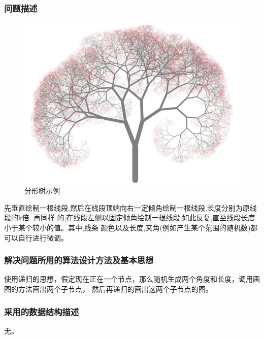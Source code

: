 \documentclass{ctexart}
\begin{document}
\subsubsection{问题描述}
\begin{figure}[H]
	\centering
	\includegraphics[scale=0.5]{../images/demo-tree.png}
	\caption{分形树示例}
\end{figure}

先垂直绘制一根线段,然后在线段顶端向右一定倾角绘制一根线段,长度分别为原线段的k倍. 再同样
的,在线段左侧以固定倾角绘制一根线段,如此反复,直至线段长度小于某个较小的值。其中,线条
颜色以及长度,夹角(例如产生某个范围的随机数)都可以自行进行微调。

\subsubsection{解决问题所用的算法设计方法及基本思想}
使用递归的思想，假定现在正在一个节点，那么随机生成两个角度和长度，调用画图的方法画出两个子节点，
然后再递归的画出这两个子节点的图。
\subsubsection{采用的数据结构描述}
无。
\end{document}
